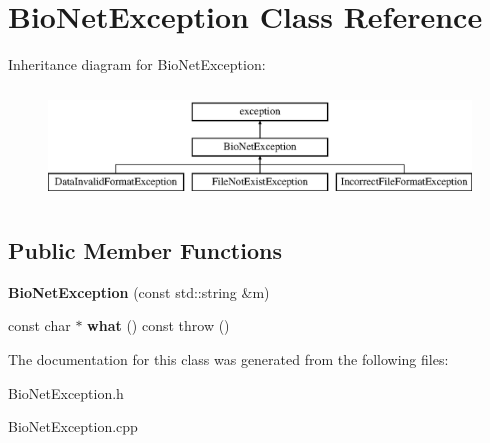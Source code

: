 \hypertarget{class_bio_net_exception}{}\section{Bio\+Net\+Exception Class Reference}
\label{class_bio_net_exception}
Inheritance diagram for Bio\+Net\+Exception\+:\begin{figure}[H]
\begin{center}
\leavevmode
\includegraphics[height=3.000000cm]{class_bio_net_exception}
\end{center}
\end{figure}
\subsection*{Public Member Functions}
\begin{DoxyCompactItemize}
\item 
\mbox{\label{class_bio_net_exception_a2b4059297de2d45bc15ce0f4de16c068}} 
{\bfseries Bio\+Net\+Exception} (const std\+::string \&m)
\item 
\mbox{\label{class_bio_net_exception_a14478e246d477f427a849276ab61f775}} 
const char $\ast$ {\bfseries what} () const  throw ()
\end{DoxyCompactItemize}


The documentation for this class was generated from the following files\+:\begin{DoxyCompactItemize}
\item 
Bio\+Net\+Exception.\+h\item 
Bio\+Net\+Exception.\+cpp\end{DoxyCompactItemize}
